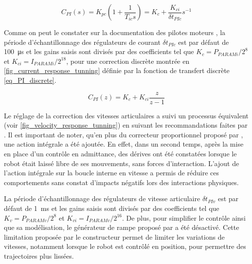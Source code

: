 \begin{appendices}
	\begin{equation} \label{eq_PI}
		C_{PI}(s) = K_{pc}\left(1 + \frac{1}{T_{ic} s}\right) = K_{c} + \frac{K_{ci}}{\delta t_{PIc}}s^{-1} %
	\end{equation}
	
	Comme on peut le constater sur la documentation des pilotes moteurs \parencite[Chapitre~12.3]{TRINAMIC_manual_2011}, la période d'échantillonnage des régulateurs de courant $\delta t_{PIc}$ est par défaut de \SI{100}{\micro\second} et les gains saisis sont divisés par des coefficients tel que $K_{c} = P_{PARAMi}/2^{8}$ et $K_{ci} = I_{PARAMi}/2^{18}$, pour une correction discrète montrée en \cref{fig_current_response_tunning} définie par la fonction de transfert discrète \cref{eq_PI_discrete}.
	
	
	
	\begin{equation} \label{eq_PI_discrete}
		C_{PI}(z) = K_{c} + K_{ci} \frac{z}{z - 1}
	\end{equation} 
	
	Le réglage de la correction des vitesses articulaires a suivi un processus équivalent (voir \cref{fig_velocity_response_tunning}) en suivant les recommandations faites par \textcite{newman_stability_1992,lamy_conception_2011}. Il est important de noter, qu'en plus du correcteur proportionnel proposé par \textcite{lamy_conception_2011}, une action intégrale a été ajoutée. En effet, dans un second temps, après la mise en place d'un contrôle en admittance, des dérives ont été constatées lorsque le robot était laissé libre de ses mouvements, sans forces d'interaction. L'ajout de l'action intégrale sur la boucle interne en vitesse a permis de réduire ces comportements sans constat d'impacts négatifs lors des interactions physiques.
	
	
	
	La période d'échantillonnage des régulateurs de vitesse articulaire $\delta t_{PIv}$ est par défaut de \SI{1}{\milli\second} et les gains saisis sont divisés par des coefficients tel que $K_{v} = P_{PARAMv}/2^{8}$ et $K_{vi} = I_{PARAMv}/2^{16}$. De plus, pour simplifier le contrôle ainsi que sa modélisation, le générateur de rampe proposé par \textcite{TRINAMIC_manual_2011} a été désactivé. Cette limitation proposée par le constructeur permet de limiter les variations de vitesses, notamment lorsque le robot est contrôlé en position, pour permettre des trajectoires plus lissées.
	

\end{appendices}
